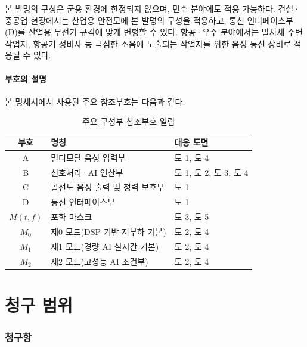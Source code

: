 \documentclass{article}
\DeclareRobustCommand{\codexedit}[1]{\textcolor{customorange}{#1}}
\begin{document}
본 발명의 구성은 군용 환경에 한정되지 않으며, 민수 분야에도 적용 가능하다. 건설·중공업 현장에서는 산업용 안전모에 본 발명의 구성을 적용하고, 통신 인터페이스부(D)를 산업용 무전기 규격에 맞게 변형할 수 있다. 항공·우주 분야에서는 발사체 주변 작업자, 항공기 정비사 등 극심한 소음에 노출되는 작업자를 위한 음성 통신 장비로 적용될 수 있다.

\subsection{부호의 설명}

본 명세서에서 사용된 주요 참조부호는 다음과 같다.

\begin{table}[H]
    \centering
    \renewcommand{\arraystretch}{1.2}
    \begin{tabular}{c|l|l}
        \hline
        \textbf{부호} & \textbf{명칭} & \textbf{대응 도면} \\
        \hline\hline
        A & 멀티모달 음성 입력부 & 도 1, 도 4 \\
        \hline
        B & 신호처리·AI 연산부 & 도 1, 도 2, 도 3, 도 4 \\
        \hline
        C & 골전도 음성 출력 및 청력 보호부 & 도 1 \\
        \hline
        D & 통신 인터페이스부 & 도 1 \\
        \hline
        $M(t,f)$ & 포화 마스크 & 도 3, 도 5 \\
        \hline
        $M_{0}$ & \codexedit{제0 모드(DSP 기반 저부하 기본)} & 도 2, 도 4 \\
        \hline
        $M_{1}$ & \codexedit{제1 모드(경량 AI 실시간 기본)} & 도 2, 도 4 \\
        \hline
        $M_{2}$ & \codexedit{제2 모드(고성능 AI 조건부)} & 도 2, 도 4 \\
        \hline
    \end{tabular}
    \caption{주요 구성부 참조부호 일람}
\end{table}


\part{청구 범위}

\section*{청구항}
\end{document}
